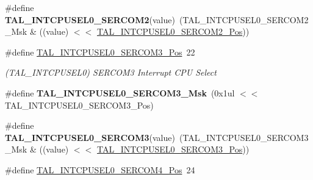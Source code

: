 \begin{DoxyCompactItemize}
\item 
\hypertarget{group___s_a_m_l21___t_a_l_gae2e6efddc354957a40ca88010112a882}{}\#define {\bfseries T\+A\+L\+\_\+\+I\+N\+T\+C\+P\+U\+S\+E\+L0\+\_\+\+S\+E\+R\+C\+O\+M2}(value)~(T\+A\+L\+\_\+\+I\+N\+T\+C\+P\+U\+S\+E\+L0\+\_\+\+S\+E\+R\+C\+O\+M2\+\_\+\+Msk \& ((value) $<$$<$ \hyperlink{group___s_a_m_l21___t_a_l_gab940875b11125589ba7a4ee48e0bd5ab}{T\+A\+L\+\_\+\+I\+N\+T\+C\+P\+U\+S\+E\+L0\+\_\+\+S\+E\+R\+C\+O\+M2\+\_\+\+Pos}))\label{group___s_a_m_l21___t_a_l_gae2e6efddc354957a40ca88010112a882}

\item 
\hypertarget{group___s_a_m_l21___t_a_l_ga87bc0e60166350e490c914882cb36006}{}\#define \hyperlink{group___s_a_m_l21___t_a_l_ga87bc0e60166350e490c914882cb36006}{T\+A\+L\+\_\+\+I\+N\+T\+C\+P\+U\+S\+E\+L0\+\_\+\+S\+E\+R\+C\+O\+M3\+\_\+\+Pos}~22\label{group___s_a_m_l21___t_a_l_ga87bc0e60166350e490c914882cb36006}

\begin{DoxyCompactList}\small\item\em (T\+A\+L\+\_\+\+I\+N\+T\+C\+P\+U\+S\+E\+L0) S\+E\+R\+C\+O\+M3 Interrupt C\+P\+U Select \end{DoxyCompactList}\item 
\hypertarget{group___s_a_m_l21___t_a_l_gadb8c2285939e1ad8f7850d3bef4f4068}{}\#define {\bfseries T\+A\+L\+\_\+\+I\+N\+T\+C\+P\+U\+S\+E\+L0\+\_\+\+S\+E\+R\+C\+O\+M3\+\_\+\+Msk}~(0x1ul $<$$<$ T\+A\+L\+\_\+\+I\+N\+T\+C\+P\+U\+S\+E\+L0\+\_\+\+S\+E\+R\+C\+O\+M3\+\_\+\+Pos)\label{group___s_a_m_l21___t_a_l_gadb8c2285939e1ad8f7850d3bef4f4068}

\item 
\hypertarget{group___s_a_m_l21___t_a_l_ga6412d2615aa170efe269fb2b2b7091d8}{}\#define {\bfseries T\+A\+L\+\_\+\+I\+N\+T\+C\+P\+U\+S\+E\+L0\+\_\+\+S\+E\+R\+C\+O\+M3}(value)~(T\+A\+L\+\_\+\+I\+N\+T\+C\+P\+U\+S\+E\+L0\+\_\+\+S\+E\+R\+C\+O\+M3\+\_\+\+Msk \& ((value) $<$$<$ \hyperlink{group___s_a_m_l21___t_a_l_ga87bc0e60166350e490c914882cb36006}{T\+A\+L\+\_\+\+I\+N\+T\+C\+P\+U\+S\+E\+L0\+\_\+\+S\+E\+R\+C\+O\+M3\+\_\+\+Pos}))\label{group___s_a_m_l21___t_a_l_ga6412d2615aa170efe269fb2b2b7091d8}

\item 
\hypertarget{group___s_a_m_l21___t_a_l_ga26bb9bb5ff3cfe744a45b16544247f97}{}\#define \hyperlink{group___s_a_m_l21___t_a_l_ga26bb9bb5ff3cfe744a45b16544247f97}{T\+A\+L\+\_\+\+I\+N\+T\+C\+P\+U\+S\+E\+L0\+\_\+\+S\+E\+R\+C\+O\+M4\+\_\+\+Pos}~24\label{group___s_a_m_l21___t_a_l_ga26bb9bb5ff3cfe744a45b16544247f97}


\end{DoxyCompactItemize}
